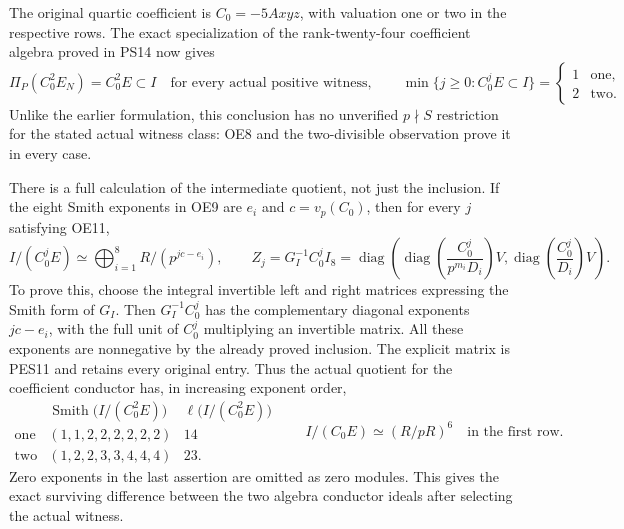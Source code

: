 \documentclass[11pt]{article}
\begin{document}
The original quartic coefficient is $C_0=-5Axyz$, with valuation
one or two in the respective rows. The exact specialization of
the rank-twenty-four coefficient algebra proved in PS14 now gives
\begin{equation}
 \Pi_P(C_0^2E_N)=C_0^2E\subset I
 \quad\text{for every actual positive witness},\qquad
 \min\{j\ge0:C_0^jE\subset I\}
  =\begin{cases}1&\text{one},\\2&\text{two}.
                      \end{cases}                      \tag{OE11}
\end{equation}
Unlike the earlier formulation, this conclusion has no unverified
$p\nmid S$ restriction for the stated actual witness class: OE8
and the two-divisible observation prove it in every case.

There is a full calculation of the intermediate quotient, not just
the inclusion. If the eight Smith exponents in OE9 are $e_i$ and
$c=v_p(C_0)$, then for every $j$ satisfying OE11,
\begin{equation}
 I/(C_0^jE)\simeq\bigoplus_{i=1}^8R/(p^{jc-e_i}),
 \qquad
 Z_j=G_I^{-1}C_0^jI_8
  =\operatorname{diag}\left(
   \operatorname{diag}\left(\frac{C_0^j}{p^{m_i}D_i}\right)V,
   \operatorname{diag}\left(\frac{C_0^j}{D_i}\right)V\right).
                                                               \tag{OE12}
\end{equation}
To prove this, choose the integral invertible left and right
matrices expressing the Smith form of $G_I$. Then $G_I^{-1}C_0^j$
has the complementary diagonal exponents $jc-e_i$, with the full
unit of $C_0^j$ multiplying an invertible matrix. All these
exponents are nonnegative by the already proved inclusion. The
explicit matrix is PES11 and retains every original entry. Thus
the actual quotient for the coefficient conductor has, in
increasing exponent order,
\begin{equation}
 \begin{array}{c|c|c}
 & \operatorname{Smith}\bigl(I/(C_0^2E)\bigr)&
                 \ell\bigl(I/(C_0^2E)\bigr)\\\hline
 \text{one}&(1,1,2,2,2,2,2,2)&14\\
 \text{two}&(1,2,2,3,3,4,4,4)&23.
 \end{array}
 \qquad I/(C_0E)\simeq(R/pR)^6\quad\text{in the first row}.
                                                               \tag{OE13}
\end{equation}
Zero exponents in the last assertion are omitted as zero modules.
This gives the exact surviving difference between the two algebra
conductor ideals after selecting the actual witness.
\end{document}
